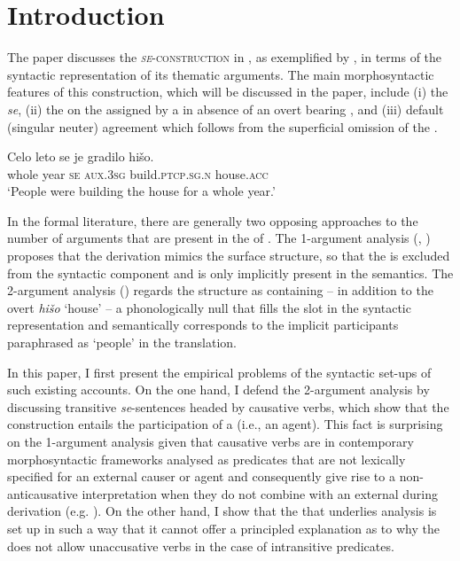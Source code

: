 \documentclass[output=paper,nonflat,newtxmath]{langsci/langscibook}
\author{Jakob Lenardič\affiliation{University of Ljubljana}}
\begin{document}
\maketitle
{}
\section{Introduction}
The paper discusses the \textsc{ \textit{se}-construction} in , as exemplified by , in terms of the syntactic representation of its thematic arguments. The main morphosyntactic features of this construction, which will be discussed in the paper, include (i) the  \textit{se}, (ii) the  on the  assigned by a  in absence of an overt  bearing , and (iii) default (singular neuter) agreement which follows from the superficial omission of the .

\ea  \label{ex:lenardic:1}
\gll Celo leto se je gradilo hišo.\\
   whole year \textsc{se} \textsc{aux}.\textsc{3sg} build.\textsc{ptcp.sg.n} house.\textsc{acc}\\
\glt `People were building the house for a whole year.'
\z

\noindent In the formal literature, there are generally two opposing approaches to the number of arguments that are present in the  of . The 1-argument analysis (\citealt{marelj2004}, \citealt{grahek2008}) proposes that the derivation mimics the surface structure, so that the  is excluded from the syntactic component and is only implicitly present in the semantics. The 2-argument analysis (\citealt{riverosheppard2003}) regards the structure as containing – in addition to the overt  \textit{hišo} `house' – a phonologically null  that fills the  slot in the syntactic representation and semantically corresponds to the implicit  participants paraphrased as `people' in the  translation.

In this paper, I first present the empirical problems of the syntactic set-ups of such existing accounts. On the one hand, I defend the 2-argument analysis by discussing transitive  \textit{se}-sentences headed by causative verbs, which show that the construction entails the participation of a  (i.e., an agent). This fact is surprising on the 1-argument analysis given that causative verbs are in contemporary morphosyntactic frameworks analysed as predicates that are not lexically specified for an external causer or agent and consequently give rise to a non- anticausative interpretation when they do not combine with an external  during derivation (e.g. \citealt{alexiadouet2015}). On the other hand, I show that the  that underlies  analysis is set up in such a way that it cannot offer a principled explanation as to why the  does not allow unaccusative verbs in the case of intransitive predicates.
\end{document}
